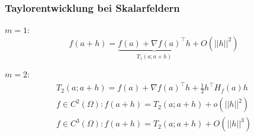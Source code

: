 \subsubsection{Taylorentwicklung bei Skalarfeldern}
$m=1:$
\begin{equation*}
    f(a+h)=\underbrace{f(a)+\nabla f(a)^\top h}_{T_1(a;a+h)}+O(||h||^2)
\end{equation*}

$m=2:$
\begin{align*}
    T_2(a;a+h)=f(a)+\nabla f(a)^\top h+\frac{1}{2}h^\top H_f(a)h \\
    f \in C^2(\Omega): f(a+h)=T_2(a;a+h)+o(||h||^2)              \\
    f \in C^3(\Omega): f(a+h)=T_2(a;a+h)+O(||h||^3)
\end{align*}